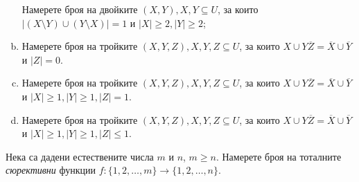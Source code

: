 \begin{problem}
\begin{enumerate}[a)]
    Намерете броя на двойките $(X,Y), X,Y\subseteq U$, за които $|(X\setminus Y)\cup(Y\setminus X)| = 1$ и 
    $|X|\geq 2, |Y|\geq 2$;
  \item
    Намерете броя на тройките $(X,Y,Z), X,Y,Z\subseteq U$, за които $X\cup Y\overline{Z} = \overline{X}\cup\overline{Y}$ и
    $|Z| = 0$.
  \item
    Намерете броя на тройките $(X,Y,Z), X,Y,Z\subseteq U$, за които $X\cup Y\overline{Z} = \overline{X}\cup\overline{Y}$ и
    $|X|\geq 1, |Y|\geq 1, |Z| = 1$.
  \item
    Намерете броя на тройките $(X,Y,Z), X,Y,Z\subseteq U$, за които $X\cup Y\overline{Z} = \overline{X}\cup\overline{Y}$ и
    $|X|\geq 1, |Y|\geq 1, |Z|\leq 1$.
  \end{enumerate}
\end{problem}

\begin{problem}
  Нека са дадени естествените числа $m$ и $n$, $m\geq n$.
  Намерете броя на тоталните {\em сюрективни} функции $f:\{1,2,\dots,m\}\to\{1,2,\dots,n\}$.
\end{problem}

